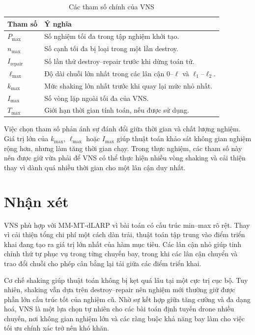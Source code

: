 \begin{table}[H]
\centering
\caption{Các tham số chính của VNS}
\label{tab:vns-parameters}
\begin{tabular}{p{3cm}p{9cm}}
\toprule
\textbf{Tham số} & \textbf{Ý nghĩa} \\
\midrule
\(P_{\max}\) & Số nghiệm tối đa trong tập nghiệm khởi tạo. \\
\(n_{\max}\) & Số cạnh tối đa bị loại trong một lần destroy. \\
\(I_{\text{repair}}\) & Số lần thử destroy--repair trước khi dừng toán tử. \\
\(\ell_{\max}\) & Độ dài chuỗi lớn nhất trong các lân cận \(0\)--\(\ell\) và \(\ell_1\)--\(\ell_2\). \\
\(k_{\max}\) & Mức shaking lớn nhất trước khi quay lại mức nhỏ nhất. \\
\(I_{\max}\) & Số vòng lặp ngoài tối đa của VNS. \\
\(T_{\max}\) & Giới hạn thời gian tính toán, nếu được sử dụng. \\
\bottomrule
\end{tabular}
\end{table}

Việc chọn tham số phản ánh sự đánh đổi giữa thời gian và chất lượng nghiệm. Giá trị lớn của \(k_{\max}\), \(\ell_{\max}\) hoặc \(I_{\max}\) giúp thuật toán khảo sát không gian nghiệm rộng hơn, nhưng làm tăng thời gian chạy. Trong thực nghiệm, các tham số này nên được giữ vừa phải để VNS có thể thực hiện nhiều vòng shaking và cải thiện thay vì dành quá nhiều thời gian cho một lân cận duy nhất.

\section{Nhận xét}
\label{sec:vns-discussion}

VNS phù hợp với MM-MT-dLARP vì bài toán có cấu trúc min--max rõ rệt. Thay vì cải thiện tổng chi phí một cách dàn trải, thuật toán tập trung vào điểm triển khai đang tạo ra giá trị lớn nhất của hàm mục tiêu. Các lân cận nhỏ giúp tinh chỉnh thứ tự phục vụ trong từng chuyến bay, trong khi các lân cận chuyển và trao đổi chuỗi cho phép cân bằng lại tải giữa các điểm triển khai.

Cơ chế shaking giúp thuật toán không bị kẹt quá lâu tại một cực trị cục bộ. Tuy nhiên, shaking vẫn dựa trên destroy--repair nên nghiệm mới thường giữ được phần lớn cấu trúc tốt của nghiệm cũ. Nhờ sự kết hợp giữa tăng cường và đa dạng hoá, VNS là một lựa chọn tự nhiên cho các bài toán định tuyến drone nhiều chuyến, nơi không gian nghiệm lớn và các ràng buộc khả năng bay làm cho việc tối ưu chính xác trở nên khó khăn.

